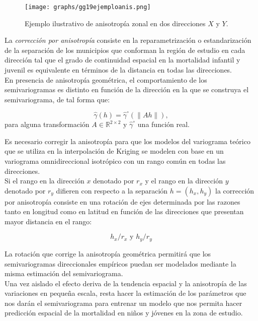 \documentclass[11pt, oneside]{book}
\begin{document}
\begin{figure}[ht]
    \centering
    \texttt{[image: graphs/gg19ejemploanis.png]}
  \caption{Ejemplo ilustrativo de anisotropía zonal en dos direcciones $X$ y $Y$.}
  \label{aniso.zonal}
\end{figure}

La \emph{corrección por anisotropía} consiste en la reparametrización o estandarización de la separación de los municipios que conforman la región de estudio en cada dirección tal que el grado de continuidad espacial en la mortalidad infantil y juvenil es equivalente en términos de la distancia en todas las direcciones.\\

En presencia de anisotropía geométrica, el comportamiento de los semivariogramas es distinto en función de la dirección en la que se construya el semivariograma, de tal forma que:

$$\hat{\gamma}(h) = \hat{\gamma}^{\circ}(\|Ah\|),$$ 
\noindent para alguna transformación $A \in \mathbb{R}^{2\times 2}$ y $\hat{\gamma}^{\circ}$ una función real.

\bigskip

Es necesario corregir la anisotropía para que los modelos del variograma teórico que se utiliza en la interpolación de Kriging se modelen con base en un variograma omnidireccional isotrópico con un rango común en todas las direcciones.\\

Si el rango en la dirección $x$ denotado por $r_x$ y el rango en la dirección $y$ denotado por $r_y$ difieren con respecto a la separación $h=(h_x,h_y)$ la corrección por anisotropía consiste en una rotación de ejes determinada por las razones tanto en longitud como en latitud en función de las direcciones que presentan mayor distancia en el rango:

$$h_x/r_x \textrm{ y } h_y/r_y$$

\bigskip

La rotación que corrige la anisotropía geométrica permitirá que los semivariogramas direccionales empíricos puedan ser modelados mediante la misma estimación del semivariograma.\\

Una vez aislado el efecto deriva de la tendencia espacial y la anisotropía de las variaciones en pequeña escala, resta hacer la estimación de los parámetros que nos darán el semivariograma para entrenar un modelo que nos permita hacer predicción espacial de la mortalidad en niños y jóvenes en la zona de estudio. 
\end{document}
